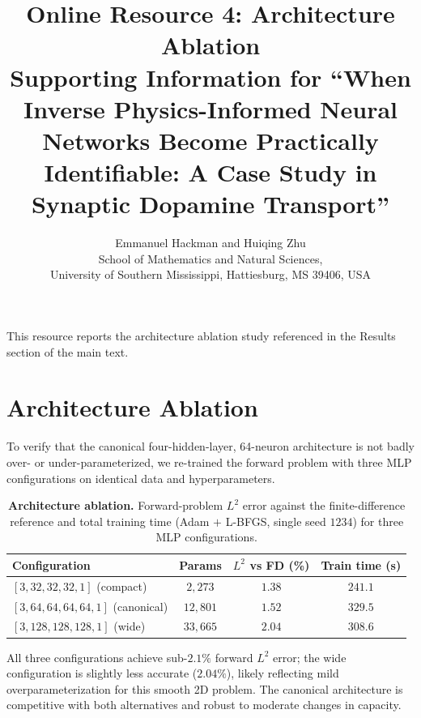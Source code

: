 \documentclass[12pt]{article}
\title{Online Resource 4: Architecture Ablation \\
\large Supporting Information for ``When Inverse
Physics-Informed Neural Networks Become Practically
Identifiable: A Case Study in Synaptic Dopamine Transport''}
\author{Emmanuel Hackman and Huiqing Zhu \\
School of Mathematics and Natural Sciences, \\
University of Southern Mississippi, Hattiesburg, MS 39406, USA}
\date{}
\begin{document}
\maketitle

This resource reports the architecture ablation study
referenced in the Results section of the main text.

\section*{Architecture Ablation}

To verify that the canonical four-hidden-layer, 64-neuron
architecture is not badly over- or under-parameterized, we
re-trained the forward problem with three MLP configurations on
identical data and hyperparameters.

\begin{table}[h!]
\centering
\caption{\textbf{Architecture ablation.}
Forward-problem $L^2$ error against the finite-difference reference and
total training time (Adam $+$ L-BFGS, single seed $1234$) for three
MLP configurations.}
\label{tab:arch_ablation}
\begin{tabular}{lccc}
\toprule
\textbf{Configuration}                 & \textbf{Params} & \textbf{$L^2$ vs FD (\%)} & \textbf{Train time (s)} \\
\midrule
$[3, 32, 32, 32, 1]$ (compact)         & $2{,}273$  & $1.38$ & $241.1$ \\
$[3, 64, 64, 64, 64, 1]$ (canonical)   & $12{,}801$ & $1.52$ & $329.5$ \\
$[3, 128, 128, 128, 1]$ (wide)         & $33{,}665$ & $2.04$ & $308.6$ \\
\bottomrule
\end{tabular}
\end{table}

All three configurations achieve sub-$2.1\%$ forward $L^2$ error;
the wide configuration is slightly less accurate ($2.04\%$),
likely reflecting mild overparameterization for this smooth
2D problem. The canonical architecture is competitive with both
alternatives and robust to moderate changes in capacity.
\end{document}
